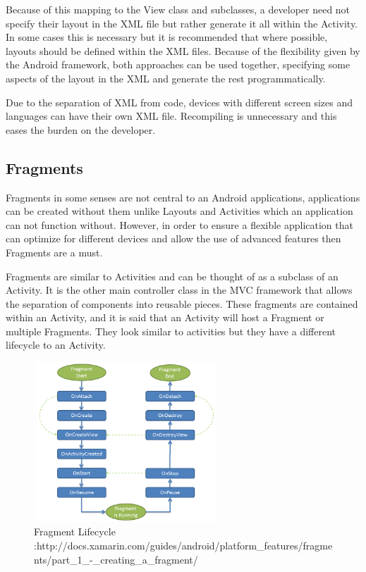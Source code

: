 \documentclass{l4proj}
\begin{document}
Because of this mapping to the View class and subclasses, a developer need not specify their layout in the XML file but rather generate it all within the Activity.  In some cases this is necessary but it is recommended that where possible, layouts should be defined within the XML files.  Because of the flexibility given by the Android framework, both approaches can be used together, specifying some aspects of the layout in the XML and generate the rest programmatically.

Due to the separation of XML from code, devices with different screen sizes and languages can have their own XML file. Recompiling is unnecessary and this eases the burden on the developer.  

\subsection{Fragments}
Fragments in some senses are not central to an Android applications, applications can be created without them unlike Layouts and Activities which an application can not function without. However, in order to ensure a flexible application that can optimize for different devices and allow the use of advanced features then Fragments are a must. 

Fragments are similar to Activities and can be thought of as a subclass of an Activity. It is the other main controller class in the MVC framework that allows the separation of components into reusable pieces.  These fragments are contained within an Activity, and it is said that an Activity will host a Fragment or multiple Fragments.  They look similar to activities but they have a different lifecycle to an Activity.

\begin{figure}
\centering
\includegraphics[height=6cm,width=7cm]{fragment_lifecycle.png}
\caption{Fragment Lifecycle :http://docs.xamarin.com/guides/android/platform\_features/fragments/part\_1\_-\_creating\_a\_fragment/}
\label{Fragment Lifecycle}
\end{figure}
\end{document}
